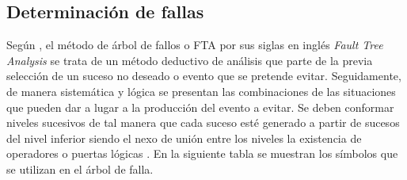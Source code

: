 \subsection{Determinación de fallas}
 
Según \cite{pique1998}, el método de árbol de fallos o FTA por sus siglas en inglés \textit{Fault Tree Analysis} se trata de un método deductivo de análisis que parte de la previa selección de un suceso no deseado o evento que se pretende evitar. Seguidamente, de manera sistemática y lógica se presentan las combinaciones de las situaciones que pueden dar a lugar a la producción del evento a evitar. Se deben conformar niveles sucesivos de tal manera que cada suceso esté generado a partir de sucesos del nivel inferior siendo el nexo de unión entre los niveles la existencia de operadores o puertas lógicas \citep{pique1998}. En la siguiente tabla se muestran los símbolos que se utilizan en el árbol de falla.
 

